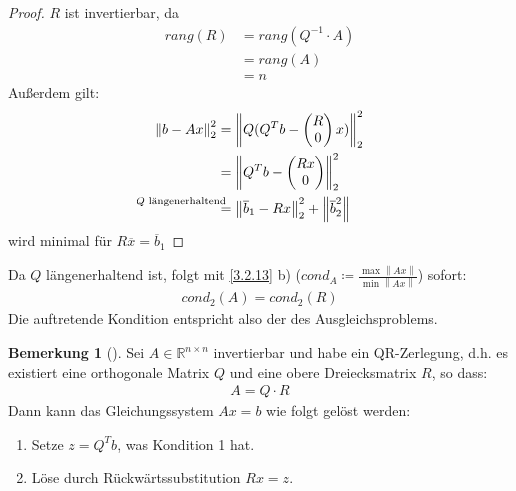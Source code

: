\documentclass[ngerman,fontsize=11pt, paper=a4, parskip=half, titlepage=true, toc=bib]{scrbook}
\theoremstyle{definition}
\newtheorem{Bem}[Def]{Bemerkung}	%
\theoremstyle{plain}
\newcommand{\Renn}{\mathds{R}^{n\times n}}
\newcommand{\nn}[1]{\left\| #1 \right\|}
\newcommand{\subsectione}[1]{\addtocounter{Def}{1}\subsection{#1}}
\newenvironment{Beme}[1][]{ %
  \begin{Bem}[#1]
  }
  {
  \end{Bem}
  \addtocounter{subsection}{1}
}
\begin{document}
\begin{proof} $R$ ist invertierbar, da 
  \begin{align*}
    rang(R) &= rang(Q^{-1}\cdot A) \\	
            & = rang(A) \\
            &= n
  \end{align*}
  Außerdem gilt:
  \begin{align*}
    \nn{b-Ax}_2^2 & = \nn{Q(Q^Tb-\begin{pmatrix}R\\0\end{pmatrix}x)}_2^2 \\
                  &=  \nn{Q^Tb-\begin{pmatrix}Rx\\0\end{pmatrix}}_2^2  \\
                  &\overset{\mathllap{\text{$Q$ längenerhaltend}}}{=}
                    \nn{\overline{b}_1 - Rx}_2^2  + \nn{\overline{b}_2^2}
  \end{align*}
  wird minimal für $R\overline{x} = \overline{b}_1$
\end{proof}

Da $Q$ längenerhaltend ist, folgt mit \ref{3.2.13} b)
($cond_A \coloneqq \frac{\max \nn{Ax}}{\min \nn{Ax}}$)
sofort:
\begin{gather*}
  cond_2(A) = cond_2(R)
\end{gather*}
Die auftretende Kondition entspricht also der des Ausgleichsproblems.


\begin{Beme}
  Sei $A\in \Renn$ invertierbar und habe ein QR-Zerlegung, d.h. es existiert
  eine orthogonale Matrix $Q$ und eine obere Dreiecksmatrix $R$, so dass:
  \begin{gather*}
    A= Q\cdot R
  \end{gather*}
  Dann kann das Gleichungssystem $Ax=b$ wie folgt gelöst werden:
  \begin{enumerate}[1.]
  \item Setze $z=Q^Tb$, was Kondition 1 hat.
  \item Löse durch Rückwärtssubstitution $Rx=z$.
  \end{enumerate}
\end{Beme}


\end{document}
